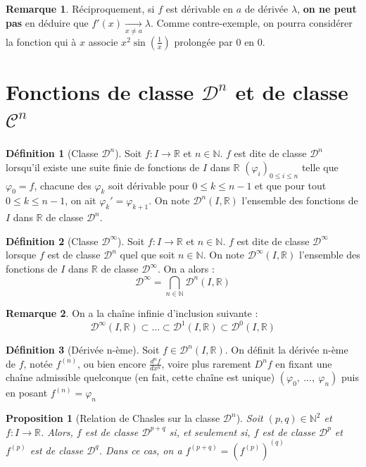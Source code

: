 \documentclass[french]{book}
\newcommand{\N}{\mathbb{N}}
\newcommand{\R}{\mathbb{R}}
\theoremstyle{plain}
\newtheorem{prop}{Proposition}[chapter]
\theoremstyle{definition}
\newtheorem{dfn}{Définition}[chapter]
\newtheorem{rmq}{Remarque}[chapter]
\theoremstyle{remark}
\begin{document}
\begin{rmq} Réciproquement, si $f$ est dérivable en $a$ de dérivée $\lambda$, \textbf{on ne peut pas} en déduire que $f'(x)\xrightarrow[x\ne a]{} \lambda$. Comme contre-exemple, on pourra considérer la fonction qui à $x$ associe $x^2\sin(\frac1x)$ prolongée par 0 en 0. \end{rmq}
\section{Fonctions de classe $\mathcal{D}^n$ et de classe $\mathcal{C}^n$}
\begin{dfn}[Classe $\mathcal{D}^n$]
	Soit $f:I\rightarrow\R$ et $n\in\N$. $f$ est dite de classe $\mathcal{D}^n$ lorsqu'il existe une suite finie de fonctions de $I$ dans $\R$ $(\varphi_i)_{0 \leqslant i \leqslant n}$ telle que $\varphi_0=f$, chacune des $\varphi_k$ soit dérivable pour $0\leqslant k \leqslant n-1$ et que pour tout $0 \leqslant k \leqslant n-1$, on ait $\varphi_k'=\varphi_{k+1}$. On note $\mathcal{D}^n(I,\R)$ l'ensemble des fonctions de $I$ dans $\R$ de classe $\mathcal{D}^n$.
\end{dfn}
\begin{dfn}[Classe $\mathcal{D}^\infty$]
	Soit $f:I\rightarrow\R$ et $n\in\N$. $f$ est dite de classe $\mathcal{D}^\infty$ lorsque $f$ est de classe $\mathcal{D}^n$ quel que soit $n \in \N$. On note $\mathcal{D}^\infty(I,\R)$ l'ensemble des fonctions de $I$ dans $\R$ de classe $\mathcal{D}^\infty$. On a alors : $$\mathcal{D}^\infty=\bigcap_{n\in\N}\mathcal{D}^n(I,\R)$$
\end{dfn}
\begin{rmq} On a la chaîne infinie d'inclusion suivante : $$\mathcal{D}^\infty(I, \R) \subset ... \subset \mathcal{D}^1(I,\R) \subset \mathcal{D}^0(I,\R)$$ \end{rmq}
\begin{dfn}[Dérivée n-ème]
	Soit $f\in\mathcal{D}^n(I,\R)$. On définit la dérivée n-ème de $f$, notée $f^{(n)}$, ou bien encore $\displaystyle \frac{d^nf}{dx^n}$, voire plus rarement $D^nf$ en fixant une chaîne admissible quelconque (en fait, cette chaîne est unique) $(\varphi_0, \ ..., \ \varphi_n)$ puis en posant $f^{(n)}=\varphi_n$
\end{dfn}
\begin{prop}[Relation de Chasles sur la classe $\mathcal{D}^n$]
	Soit $(p,q)\in\N^2$ et $f:I\rightarrow\R$. Alors, $f$ est de classe $\mathcal{D}^{p+q}$ si, et seulement si, $f$ est de classe $\mathcal{D}^p$ et $f^{(p)}$ est de classe $\mathcal{D}^q$. Dans ce cas, on a $f^{(p+q)}=(f^{(p)})^{(q)}$
\end{prop}
\end{document}
